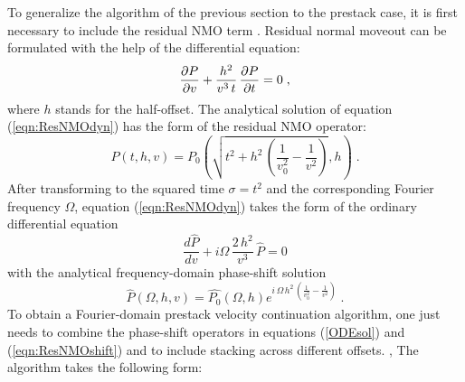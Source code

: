 To generalize the algorithm of the previous section to the prestack case, it is
first necessary to include the residual NMO term \cite[]{first}.  Residual normal
moveout can be formulated with the help of the differential equation:
\begin{equation}
{{\partial P} \over {\partial v}} + 
{{h^2} \over {v^3\,t}}\,{{\partial P} \over {\partial t}} = 0\;,
\label{eqn:ResNMOdyn} 
\end{equation}
where $h$ stands for the half-offset.  The analytical solution of
equation (\ref{eqn:ResNMOdyn}) has the form of the residual NMO
operator:
\begin{equation}
  P(t,h,v) = P_0\left(\sqrt{t^2 + h^2\,
    \left(\frac{1}{v_0^2} - \frac{1}{v^2}\right)},h\right)\;.
\label{eqn:ResNMOsol} 
\end{equation}
After transforming to the squared time $\sigma = t^2$ and the
corresponding Fourier frequency $\Omega$, equation
(\ref{eqn:ResNMOdyn}) takes the form of the ordinary differential
equation
\begin{equation}
  \frac{d \hat{P}}{d v} + 
  i \Omega\,\frac{2\,h^2}{v^3}\,\hat{P} = 0
\label{eqn:FFTResNMO} 
\end{equation}
with the analytical frequency-domain phase-shift solution
\begin{equation}
  \hat{P} (\Omega, h, v) = \hat{P_0} (\Omega,h) e^{i\,\Omega\,h^2\,
    \left(\frac{1}{v_0^2} - \frac{1}{v^2}\right)}\;.
\label{eqn:ResNMOshift} 
\end{equation}
To obtain a Fourier-domain prestack velocity continuation algorithm, one just
needs to combine the phase-shift operators in equations (\ref{ODEsol}) and
(\ref{eqn:ResNMOshift}) and to include stacking across different offsets. 
\cite[]{first},   The algorithm takes the
following form:
